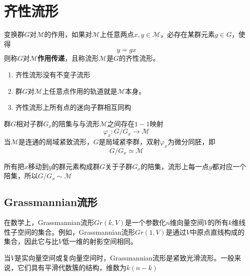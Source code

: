 \documentclass{article}
\numberwithin{equation}{subsection}
\begin{document}
\section{齐性流形}
变换群$G$对$\mathcal{M}$的作用，如果对$\mathcal{M}$上任意两点$x,y\in\mathcal{M}$，必存在某群元素$g\in G$，使得
\begin{equation}
    y=gx
\end{equation}
则称$G$对$\mathcal{M}$\textbf{作用传递}，且称流形$\mathcal{M}$是$G$的齐性流形。
\begin{enumerate}
    \item 齐性流形没有不变子流形
    \item 群$G$对$\mathcal{M}$上任意点作用的轨道就是$\mathcal{M}$本身。
    \item 齐性流形上所有点的迷向子群相互同构
\end{enumerate}
群$G$相对子群$G_x$的陪集与与流形$\mathcal{M}$之间存在$1-1$映射
\begin{equation}
    \varphi_x:G/G_x\rightarrow \mathcal{M}
\end{equation}
当$\mathcal{M}$是连通的局域紧致流形，$G$是局域紧李群，双射$\varphi_x$为微分同胚，即
\begin{equation}
    G/G_x\simeq \mathcal{M}
\end{equation}
\begin{center}
\end{center}
所有把$x$移动到$y$的群元素构成群$G$关于子群$G_x$的陪集，流形上每一点$y$都对应一个陪集，所以$G/G_x\sim \mathcal{M}$
\subsection{Grassmannian流形}
在数学上，Grassmannian流形$Gr(k, V)$是一个参数化$n$维向量空间$V$的所有$k$维线性子空间的集合。例如，Grassmannian流形$Gr(1, V)$是通过$V$中原点直线构成的集合，因此它与比$V$低一维的射影空间相同。

当$V$是实向量空间或复向量空间时，Grassmannian流形是紧致光滑流形。一般来说，它们具有平滑代数簇的结构，维数为$k(n-k)$
\end{document}
